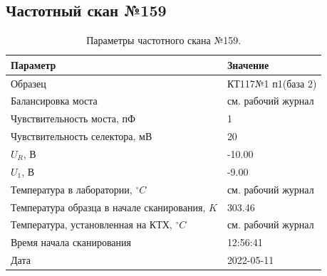 \subsection{Частотный скан №159}
\begin{table}[!ht]
    \centering
    \caption{Параметры частотного скана №159.}
    \begin{tabular}{|l|l|}
        \hline
        Параметр                                       & Значение                  \\ \hline
        Образец                                        & КТ117№1 п1(база 2)        \\ \hline
        Балансировка моста                             & см. рабочий журнал        \\ \hline
        Чувствительность моста, пФ                     & 1                         \\ \hline
        Чувствительность селектора, мВ                 & 20                        \\ \hline
        $U_R$, В                                       & -10.00                    \\ \hline
        $U_1$, В                                       & -9.00                     \\ \hline
        Температура в лаборатории, $^\circ C$          & см. рабочий журнал        \\ \hline
        Температура образца в начале сканирования, $K$ & 303.46                    \\ \hline
        Температура, установленная на КТХ, $^\circ C$  & см. рабочий журнал        \\ \hline
        Время начала сканирования                      & 12:56:41                  \\ \hline
        Дата                                           & 2022-05-11                \\ \hline
    \end{tabular}
    \label{table:frequency_scan_159}
\end{table}

